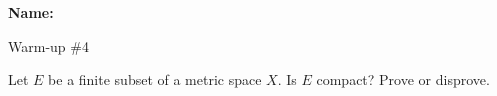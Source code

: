\documentclass[12pt]{article}
\begin{document}
\noindent \textbf{Name:} 

\begin{center}
Warm-up \#4
\end{center}

\noindent Let $E$ be a finite subset of a metric space $X$. Is $E$ compact? Prove or disprove.  
\end{document}
